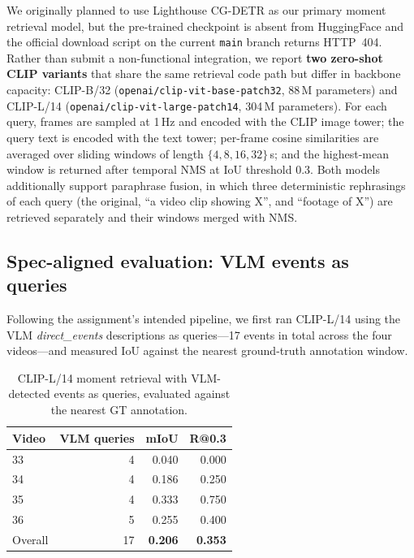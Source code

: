 \documentclass[sigconf, nonacm]{acmart}
\begin{document}
We originally planned to use Lighthouse CG-DETR as our primary moment
retrieval model, but the pre-trained checkpoint is absent from HuggingFace
and the official download script on the current \texttt{main} branch
returns HTTP~404. Rather than submit a non-functional integration, we
report \textbf{two zero-shot CLIP variants} that share the same retrieval
code path but differ in backbone capacity: CLIP-B/32
(\texttt{openai/\allowbreak clip-vit-base-patch32}, 88\,M parameters) and CLIP-L/14
(\texttt{openai/\allowbreak clip-vit-large-patch14}, 304\,M parameters). For each
query, frames are sampled at 1\,Hz and encoded with the CLIP image tower;
the query text is encoded with the text tower; per-frame cosine similarities
are averaged over sliding windows of length $\{4, 8, 16, 32\}$\,s; and the
highest-mean window is returned after temporal NMS at IoU threshold 0.3.
Both models additionally support paraphrase fusion, in which three
deterministic rephrasings of each query (the original, ``a video clip
showing X'', and ``footage of X'') are retrieved separately and their
windows merged with NMS.

\subsection*{Spec-aligned evaluation: VLM events as queries}

Following the assignment's intended pipeline, we first ran CLIP-L/14
using the VLM \textit{direct\_events} descriptions as queries---17 events
in total across the four videos---and measured IoU against the nearest
ground-truth annotation window.

\begin{table}[h]
  \centering
  \caption{CLIP-L/14 moment retrieval with VLM-detected events as
           queries, evaluated against the nearest GT annotation.}
  \label{tab:vlm-mr}
  \begin{tabular}{lrrr}
    \toprule
    Video & VLM queries & mIoU & R@0.3 \\
    \midrule
    33 & 4 & 0.040 & 0.000 \\
    34 & 4 & 0.186 & 0.250 \\
    35 & 4 & 0.333 & 0.750 \\
    36 & 5 & 0.255 & 0.400 \\
    \midrule
    Overall & 17 & \textbf{0.206} & \textbf{0.353} \\
    \bottomrule
  \end{tabular}
\end{table}
\end{document}

